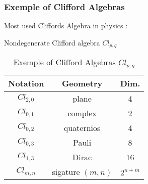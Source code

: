 \label{hyperlinks}
\begin{frame}\frametitle{Exemple of Clifford Algebras}



Most used Cliffords Algebra in physics :\\
\begin{center}
Nondegenerate Clifford algebra  $Cl_{p,q}$
\end{center}


\begin{table}[htp]
 \centering
\begin{tabular}{ccc}\hline

\textbf{Notation} & \textbf{Geometry} & \textbf{Dim.}\\\hline
$Cl_{2,0}$ & plane & 4\\\hline
$Cl_{0,1}$ & complex & 2\\\hline
$Cl_{0,2}$ & quaternios & 4\\\hline
$Cl_{0,3}$ & Pauli & 8\\\hline
$Cl_{1,3}$ & Dirac & 16\\\hline
$Cl_{m,n}$ & sigature $(m,n)$ & $2^{n+m}$\\\hline
\end{tabular}

 \caption{Exemple of Clifford Algebras  $Cl_{p,q}$ }
\end{table}




\end{frame}
